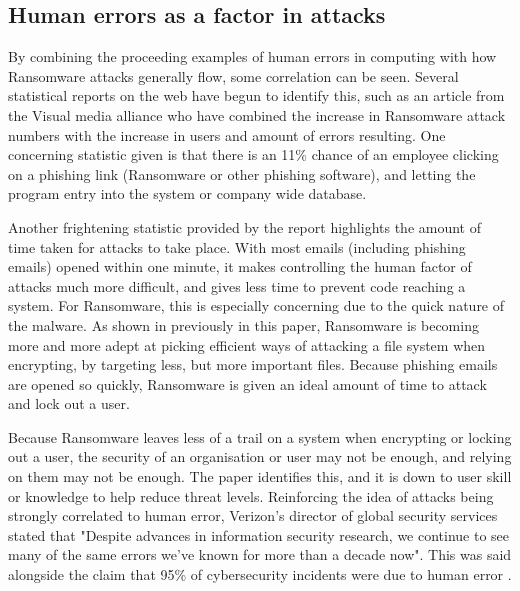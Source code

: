 \documentclass[journal,comsoc]{IEEEtran}
\begin{document}
\subsection{Human errors as a factor in attacks}
By combining the proceeding examples of human errors in computing with how Ransomware attacks generally flow, some correlation can be seen. Several statistical reports on the web have begun to identify this, such as an article from the Visual media alliance \cite{visual-media} who have combined the increase in Ransomware attack numbers with the increase in users and amount of errors resulting. One concerning statistic given is that there is an 11\% chance of an employee clicking on a phishing link (Ransomware or other phishing software), and letting the program entry into the system or company wide database. \par
Another frightening statistic provided by the report highlights the amount of time taken for attacks to take place. With most emails (including phishing emails) opened within one minute, it makes controlling the human factor of attacks much more difficult, and gives less time to prevent code reaching a system. For Ransomware, this is especially concerning due to the quick nature of the malware. As shown in previously in this paper, Ransomware is becoming more and more adept at picking efficient ways of attacking a file system when encrypting, by targeting less, but more important files. Because phishing emails are opened so quickly, Ransomware is given an ideal amount of time to attack and lock out a user. \par
Because Ransomware leaves less of a trail on a system when encrypting or locking out a user, the security of an organisation or user may not be enough, and relying on them may not be enough. The paper identifies this, and it is down to user skill or knowledge to help reduce threat levels.
Reinforcing the idea of attacks being strongly correlated to human error, Verizon's director of global security services stated that "Despite advances in information security research, we continue to see many of the same errors we've known for more than a decade now".  This was said alongside the claim that 95\% of cybersecurity incidents were due to human error \cite{human-error}.  
\end{document}
